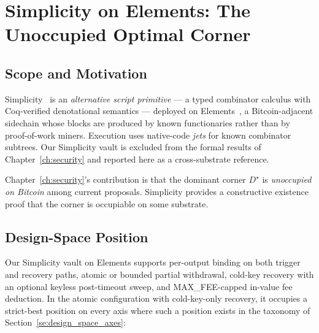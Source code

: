 \chapter{Simplicity on Elements: The Unoccupied Optimal Corner}
\label{app:simplicity}

\section{Scope and Motivation}
\label{app:simplicity:scope}

Simplicity~\cite{OC17} is an \emph{alternative script primitive} --- a
typed combinator calculus with Coq-verified denotational semantics ---
deployed on Elements~\cite{DPNS16}, a Bitcoin-adjacent sidechain whose
blocks are produced by known functionaries rather than by proof-of-work
miners. Execution uses native-code \emph{jets} for known combinator
subtrees. Our Simplicity vault is excluded from the formal results of
Chapter~\ref{ch:security} and reported here as a cross-substrate
reference.

Chapter~\ref{ch:security}'s contribution is that the dominant corner
$D^\star$ is \emph{unoccupied on Bitcoin} among current proposals.
Simplicity provides a constructive existence proof that the corner is
occupiable on some substrate.

\section{Design-Space Position}
\label{app:simplicity:axes}

Our Simplicity vault on Elements supports per-output binding on both
trigger and recovery paths, atomic or bounded partial withdrawal,
cold-key recovery with an optional keyless post-timeout sweep, and
MAX\_FEE-capped in-value fee deduction. In the atomic configuration
with cold-key-only recovery, it occupies a strict-best position on
every axis where such a position exists in the taxonomy of
Section~\ref{se:design_space_axes}:

